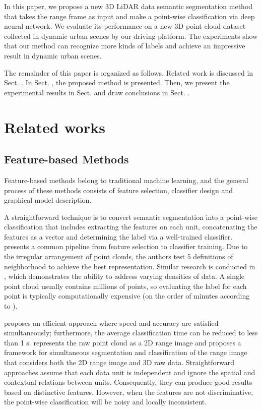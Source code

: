 	In this paper, we propose a new 3D LiDAR data semantic segmentation method that takes the range frame as input and make a point-wise classification via deep neural network. We evaluate its performance on a new 3D point cloud dataset collected in dynamic urban scenes by our driving platform. The experiments show that our method can recognize more kinds of labels and achieve an impressive result in dynamic urban scenes.
	
	The remainder of this paper is organized as follows. Related work is discussed in Sect. \uppercase\expandafter{}. In Sect. \uppercase\expandafter{}, the proposed method is presented. Then, we present the experimental results in Sect. \uppercase\expandafter{} and draw conclusions in Sect. \uppercase\expandafter{}.
	

\section{Related works}
	\subsection{Feature-based Methods}
	Feature-based methods belong to traditional machine learning, and the general process of these methods consists of feature selection, classifier design and graphical model description.
	
	A straightforward technique is to convert semantic segmentation into a point-wise classification that includes extracting the features on each unit, concatenating the features as a vector and determining the label via a well-trained classifier. \cite{weinmann2014semantic} presents a common pipeline from feature selection to classifier training. Due to the irregular arrangement of point clouds, the authors test 5 definitions of neighborhood to achieve the best representation. Similar research is conducted in \cite{hackel2016fast}, which demonstrates the ability to address varying densities of data. A single point cloud usually contains millions of points, so evaluating the label for each point is typically computationally expensive (on the order of minutes according to \cite{hackel2016fast}). 
	
	\cite{hu2013efficient} proposes an efficient approach where speed and accuracy are satisfied simultaneously; furthermore, the average classification time can be reduced to less than 1 s. \cite{zhao2010scene} represents the raw point cloud as a 2D range image and proposes a framework for simultaneous segmentation and classification of the range image that considers both the 2D range image and 3D raw data. Straightforward approaches assume that each data unit is independent and ignore the spatial and contextual relations between units. Consequently, they can produce good results based on distinctive features. However, when the features are not discriminative, the point-wise classification will be noisy and locally inconsistent\cite{munoz2009onboard}.
	
